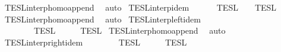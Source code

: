 \begin{isabellebody}
%
\isadelimproof
%
\endisadelimproof
%
\isatagproof
{}\isamarkupfalse%
\ TESL{\isacharunderscore}interp{\isacharunderscore}homo{\isacharunderscore}append\ \isamarkupfalse%
\ auto%
\endisatagproof
{\isafoldproof}%
%
\isadelimproof
\isanewline
%
\endisadelimproof
\isanewline
{}\isamarkupfalse%
\ TESL{\isacharunderscore}interp{\isacharunderscore}idem{\isacharcolon}\isanewline
\ \ {\isacartoucheopen}{\isasymlbrakk}{\isasymlbrakk}\ {\isasymPhi}\ {\isacharat}\ {\isasymPhi}\ {\isasymrbrakk}{\isasymrbrakk}\isactrlsub T\isactrlsub E\isactrlsub S\isactrlsub L\ {\isacharequal}\ {\isasymlbrakk}{\isasymlbrakk}\ {\isasymPhi}\ {\isasymrbrakk}{\isasymrbrakk}\isactrlsub T\isactrlsub E\isactrlsub S\isactrlsub L{\isacartoucheclose}\isanewline
%
\isadelimproof
%
\endisadelimproof
%
\isatagproof
{}\isamarkupfalse%
\ TESL{\isacharunderscore}interp{\isacharunderscore}homo{\isacharunderscore}append\ \isamarkupfalse%
\ auto%
\endisatagproof
{\isafoldproof}%
%
\isadelimproof
\isanewline
%
\endisadelimproof
\isanewline
{}\isamarkupfalse%
\ TESL{\isacharunderscore}interp{\isacharunderscore}left{\isacharunderscore}idem{\isacharcolon}\isanewline
\ \ {\isacartoucheopen}{\isasymlbrakk}{\isasymlbrakk}\ {\isasymPhi}\ {\isacharat}\ {\isacharparenleft}{\isasymPhi}\ {\isacharat}\ {\isasymPhi}\ {\isasymrbrakk}{\isasymrbrakk}\isactrlsub T\isactrlsub E\isactrlsub S\isactrlsub L\ {\isacharequal}\ {\isasymlbrakk}{\isasymlbrakk}\ {\isasymPhi}\ {\isacharat}\ {\isasymPhi}\ {\isasymrbrakk}{\isasymrbrakk}\isactrlsub T\isactrlsub E\isactrlsub S\isactrlsub L{\isacartoucheclose}\isanewline
%
\isadelimproof
%
\endisadelimproof
%
\isatagproof
{}\isamarkupfalse%
\ TESL{\isacharunderscore}interp{\isacharunderscore}homo{\isacharunderscore}append\ \isamarkupfalse%
\ auto%
\endisatagproof
{\isafoldproof}%
%
\isadelimproof
\isanewline
%
\endisadelimproof
\isanewline
{}\isamarkupfalse%
\ TESL{\isacharunderscore}interp{\isacharunderscore}right{\isacharunderscore}idem{\isacharcolon}\isanewline
\ \ {\isacartoucheopen}{\isasymlbrakk}{\isasymlbrakk}\ {\isacharparenleft}{\isasymPhi}\ {\isacharat}\ {\isasymPhi}\ {\isacharat}\ {\isasymPhi}\ {\isasymrbrakk}{\isasymrbrakk}\isactrlsub T\isactrlsub E\isactrlsub S\isactrlsub L\ {\isacharequal}\ {\isasymlbrakk}{\isasymlbrakk}\ {\isasymPhi}\ {\isacharat}\ {\isasymPhi}\ {\isasymrbrakk}{\isasymrbrakk}\isactrlsub T\isactrlsub E\isactrlsub S\isactrlsub L{\isacartoucheclose}\isanewline

\end{isabellebody}
